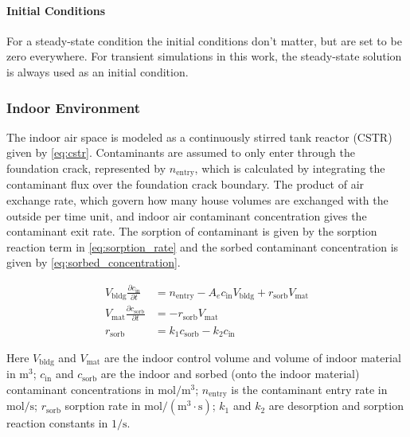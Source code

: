 \paragraph{Initial Conditions}

For a steady-state condition the initial conditions don't matter, but are set to be zero everywhere.
For transient simulations in this work, the steady-state solution is always used as an initial condition.

\subsubsection{Indoor Environment}

The indoor air space is modeled as a continuously stirred tank reactor (CSTR) given by \eqref{eq:cstr}.
Contaminants are assumed to only enter through the foundation crack, represented by $n_\mathrm{entry}$, which is calculated by integrating the contaminant flux over the foundation crack boundary.
The product of air exchange rate, which govern how many house volumes are exchanged with the outside per time unit, and indoor air contaminant concentration gives the contaminant exit rate.
The sorption of contaminant is given by the sorption reaction term in \eqref{eq:sorption_rate} and the sorbed contaminant concentration is given by \eqref{eq:sorbed_concentration}.

\begin{align}
  V_\mathrm{bldg} \frac{\partial c_\mathrm{in}}{\partial t} &= n_\mathrm{entry} - A_e c_\mathrm{in} V_\mathrm{bldg} + r_\mathrm{sorb} V_\mathrm{mat}\label{eq:cstr} \\
  V_\mathrm{mat} \frac{\partial c_\mathrm{sorb}}{\partial t} &= -r_\mathrm{sorb} V_\mathrm{mat}\label{eq:sorbed_concentration} \\
  r_\mathrm{sorb} &= k_1 c_\mathrm{sorb} - k_2 c_\mathrm{in}\label{eq:sorption_rate}
\end{align}

Here $V_\mathrm{bldg}$ and $V_\mathrm{mat}$ are the indoor control volume and volume of indoor material in $\mathrm{m^3}$;
$c_\mathrm{in}$ and $c_\mathrm{sorb}$ are the indoor and sorbed (onto the indoor material) contaminant concentrations in $\mathrm{mol/m^3}$;
$n_\mathrm{entry}$ is the contaminant entry rate in $\mathrm{mol/s}$;
$r_\mathrm{sorb}$ sorption rate in $\mathrm{mol/(m^3 \cdot s)}$;
$k_1$ and $k_2$ are desorption and sorption reaction constants in $\mathrm{1/s}$.\par %

